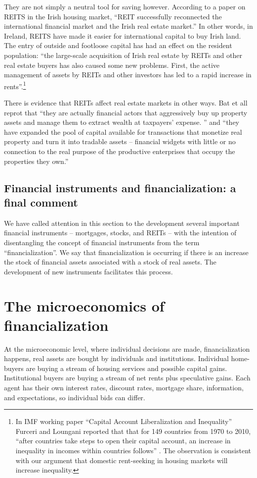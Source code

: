 They are not simply a neutral tool for saving however. According to a paper \cite{wangAnalyzeImpactREITs2021} on REITS in the Irish housing market, ``REIT successfully reconnected the international financial market and the Irish real estate market.'' In other words, in Ireland, REITS have made it easier for international capital to buy Irish land. The entry of outside and footloose capital has had an effect on the resident population:  ``the large-scale acquisition of Irish real estate by REITs and other real estate buyers has also caused some new problems. First, the active management of assets by REITs and other investors has led to a rapid increase in rents''.\footnote{In  IMF working paper ``Capital Account Liberalization and Inequality'' \cite{furceriCapitalAccountLiberalization2015}  Furceri and Loungani reported that that for 149 countries from 1970 to 2010, ``after countries take steps to open their capital account, an increase in inequality in incomes within countries follows'' . The observation is consistent with our argument  that domestic rent-seeking in housing markets will increase inequality.}   

There is evidence that REITs affect real estate markets in other ways. Bat et all  \cite{batRolePublicREITs2022} reprot that  ``they are actually financial actors that aggressively buy up property assets and manage them to extract wealth at taxpayers’ expense. '' and ``they have expanded the pool of capital available for transactions that monetize real property and turn it into tradable assets – financial widgets with little or no connection to the real purpose of the productive enterprises that occupy the properties they own.''

\subsection{Financial instruments and financialization: a final comment}
We have called attention in this section to the development  several important financial instruments -- mortgages, stocks, and REITs --  with the intention of  disentangling the concept of financial instruments from the term ``financialization''.  We say that financialization is occurring if there is an  increase the stock of financial assets associated with a stock of real assets. The development of new instruments facilitates this process. 

\section{The microeconomics of  financialization}\label{section-micro}
At  the microeconomic level, where individual decisions are made, financialization happens,  real assets are bought by individuals and institutions. Individual home-buyers are buying a stream of housing services and possible capital gains. Institutional buyers are buying a stream of net rents plus speculative gains. Each agent has their own interest rates, discount rates, mortgage share, information, and expectations, so individual bids can differ.

